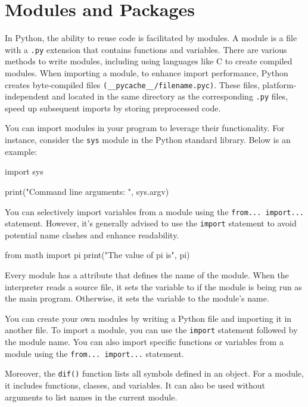 \section{Modules and Packages}

In Python, the ability to reuse code is facilitated by modules. A module is a file with a \texttt{.py}
extension that contains functions and variables. There are various methods to write modules,
including using languages like C to create compiled modules.
When importing a module, to enhance import performance, Python creates byte-compiled files
\texttt{(\_\_pycache\_\_/filename.pyc)}. These files, platform-independent and located in the same
directory as the corresponding \texttt{.py} files, speed up subsequent imports by storing preprocessed
code.

You can import modules in your program to leverage their functionality. For instance, consider the
\texttt{sys} module in the Python standard library. Below is an example:
\begin{codeblock}[language=Python]
import sys

print("Command line arguments: ", sys.argv)
\end{codeblock}

You can selectively import variables from a module using the \texttt{from... import...} statement.
However, it's generally advised to use the \texttt{import} statement to avoid potential name clashes and
enhance readability.

\begin{codeblock}[language=Python]
    from math import pi
    print("The value of pi is", pi)
\end{codeblock}

\begin{observationblock}
    Every module has a  attribute that defines the name of the module. When the
    interpreter reads a source file, it sets the  variable to  if the
    module is being run as the main program. Otherwise, it sets the variable to the module's name.
\end{observationblock}

You can create your own modules by writing a Python file and importing it in another file. To
import a module, you can use the \texttt{import} statement followed by the module name. You can also
import specific functions or variables from a module using the \texttt{from... import...} statement.

Moreover, the \texttt{dif()} function lists all symbols defined in an object. For a module, it includes
functions, classes, and variables. It can also be used without arguments to list names in the
current module.

